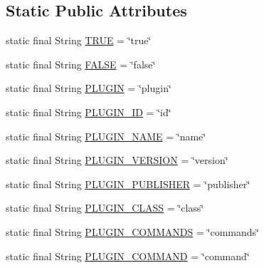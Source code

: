 \subsection*{Static Public Attributes}
\begin{DoxyCompactItemize}
\item 
static final String \hyperlink{interfaceorg_1_1tzi_1_1use_1_1runtime_1_1util_1_1_i_plugin_parser_symbols_a42e76874b54a7baeeb618aad459e4c59}{T\-R\-U\-E} = \char`\"{}true\char`\"{}
\item 
static final String \hyperlink{interfaceorg_1_1tzi_1_1use_1_1runtime_1_1util_1_1_i_plugin_parser_symbols_a6f1111e332b5b42c8a313c4a1c890458}{F\-A\-L\-S\-E} = \char`\"{}false\char`\"{}
\item 
static final String \hyperlink{interfaceorg_1_1tzi_1_1use_1_1runtime_1_1util_1_1_i_plugin_parser_symbols_ab8a2e33045b2acc715128d4f34c509bc}{P\-L\-U\-G\-I\-N} = \char`\"{}plugin\char`\"{}
\item 
static final String \hyperlink{interfaceorg_1_1tzi_1_1use_1_1runtime_1_1util_1_1_i_plugin_parser_symbols_a1c7f0fdc15a7fd97cebdca3c8d04b3b1}{P\-L\-U\-G\-I\-N\-\_\-\-I\-D} = \char`\"{}id\char`\"{}
\item 
static final String \hyperlink{interfaceorg_1_1tzi_1_1use_1_1runtime_1_1util_1_1_i_plugin_parser_symbols_abb8ad051918de6fa3024573ac222efa1}{P\-L\-U\-G\-I\-N\-\_\-\-N\-A\-M\-E} = \char`\"{}name\char`\"{}
\item 
static final String \hyperlink{interfaceorg_1_1tzi_1_1use_1_1runtime_1_1util_1_1_i_plugin_parser_symbols_aa7526d8c20efd14c97658873ac4e1255}{P\-L\-U\-G\-I\-N\-\_\-\-V\-E\-R\-S\-I\-O\-N} = \char`\"{}version\char`\"{}
\item 
static final String \hyperlink{interfaceorg_1_1tzi_1_1use_1_1runtime_1_1util_1_1_i_plugin_parser_symbols_ac5774425463526fad447b117fc88c17e}{P\-L\-U\-G\-I\-N\-\_\-\-P\-U\-B\-L\-I\-S\-H\-E\-R} = \char`\"{}publisher\char`\"{}
\item 
static final String \hyperlink{interfaceorg_1_1tzi_1_1use_1_1runtime_1_1util_1_1_i_plugin_parser_symbols_a7570406659f00dd5b974e08f57d56f37}{P\-L\-U\-G\-I\-N\-\_\-\-C\-L\-A\-S\-S} = \char`\"{}class\char`\"{}
\item 
static final String \hyperlink{interfaceorg_1_1tzi_1_1use_1_1runtime_1_1util_1_1_i_plugin_parser_symbols_af90cdf852fbda405d20f0393d3810a01}{P\-L\-U\-G\-I\-N\-\_\-\-C\-O\-M\-M\-A\-N\-D\-S} = \char`\"{}commands\char`\"{}
\item 
static final String \hyperlink{interfaceorg_1_1tzi_1_1use_1_1runtime_1_1util_1_1_i_plugin_parser_symbols_ab7029d8eef5af0ed3616e150ab1792e7}{P\-L\-U\-G\-I\-N\-\_\-\-C\-O\-M\-M\-A\-N\-D} = \char`\"{}command\char`\"{}

\end{DoxyCompactItemize}

